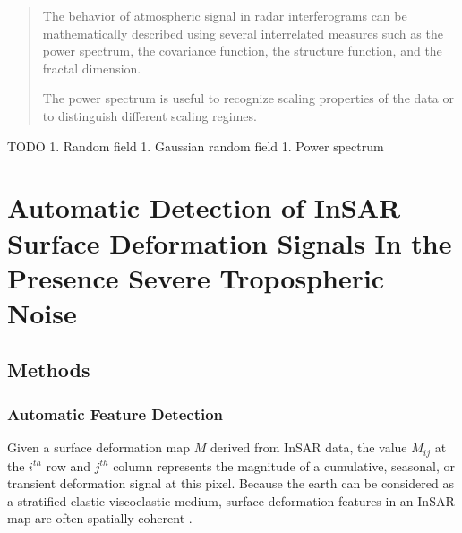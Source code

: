 \documentclass{utexasthesis}
\begin{document}
\begin{quote}
    
The behavior of atmospheric signal in radar interferograms can be mathematically described using several interrelated measures such as the power spectrum, the covariance function, the structure function, and the fractal dimension.

The power spectrum is useful to recognize scaling properties of the data or to distinguish different scaling regimes.
\end{quote}

TODO 1. Random field 1. Gaussian random field 1. Power spectrum




\chapter{Automatic Detection of InSAR Surface Deformation Signals In the Presence Severe Tropospheric Noise}


\section{Methods}
\label{sec:methods}



\subsection{Automatic Feature Detection}
\label{subsec:methods-1-log}

Given a surface deformation map $M$ derived from InSAR data, the value $ M_{ij} $ at the $i^{th}$ row and $j^{th}$ column represents the magnitude of a cumulative, seasonal, or transient deformation signal at this pixel. Because the earth can be considered as a stratified elastic-viscoelastic medium, surface deformation features in an InSAR map are often spatially coherent \cite{Segall2010EarthquakeVolcanoDeformation}.
\end{document}
